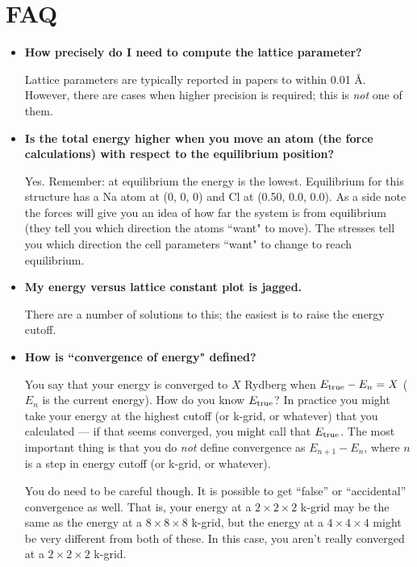 \documentclass[12pt]{article}
\begin{document}
\newpage
\section{FAQ}

\begin{itemize}

    \item
    {\bf How precisely do I need to compute the lattice parameter?}

    Lattice parameters are typically reported in papers to within 0.01 \AA.
    However, there are cases when higher precision is required; this is {\em not} 
    one of them.

    \item
    {\bf Is the total energy higher when you move an atom (the force calculations) 
    with respect to the equilibrium position?}

    Yes. Remember: at equilibrium the energy is the lowest.
    Equilibrium for this structure has a Na atom at (0, 0, 0) and Cl at
    (0.50, 0.0, 0.0).
    As a side note the forces will give you an idea of how far the system is from
    equilibrium (they tell you which direction the atoms ``want" to move).
    The stresses tell you which direction the cell parameters ``want" to change to
    reach equilibrium.

    \item
    {\bf My energy versus lattice constant plot is jagged.}

    There are a number of solutions to this; the easiest is to raise the energy
    cutoff.

    \item
    {\bf How is ``convergence of energy" defined?}

    You say that your energy is converged to $X$ Rydberg when $E_{\rm true}-E_n=X$ 
    ($E_n$ is the current energy).
    How do you know $E_{\rm true}$?
    In practice you might take your energy at the highest cutoff (or k-grid, 
    or whatever) that you calculated --- if that seems converged, you might call
    that $E_{\rm true}$.
    The most important thing is that you do {\em not} define convergence as
    $E_{n+1}-E_n$, where $n$ is a step in energy cutoff (or k-grid, or whatever).

    You do need to be careful though.
    It is possible to get “false” or “accidental” convergence as well.
    That is, your energy at a $2 \times 2 \times 2$ k-grid may be the same as
    the energy at a $8 \times 8 \times 8$ k-grid, but the energy at a 
    $4 \times 4 \times 4$ might be very different from both of these.
    In this case, you aren't really converged at a $2 \times 2 \times 2$ k-grid.


\end{itemize}
\end{document}
